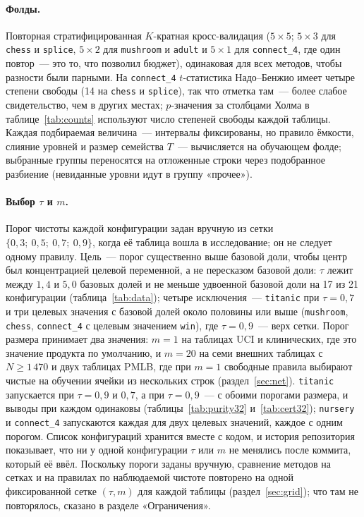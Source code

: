 \documentclass[11pt]{article}
\begin{document}
\paragraph{Фолды.} Повторная стратифицированная $K$-кратная кросс-валидация ($5\times5$; $5\times3$ для \texttt{chess} и \texttt{splice}, $5\times2$ для \texttt{mushroom} и \texttt{adult} и $5\times1$ для \texttt{connect\_4}, где один повтор~--- это то, что позволил бюджет), одинаковая для всех методов, чтобы разности были парными. На \texttt{connect\_4} $t$-статистика Надо--Бенжио имеет четыре степени свободы (14 на \texttt{chess} и \texttt{splice}), так что отметка там~--- более слабое свидетельство, чем в других местах; $p$-значения за столбцами Холма в таблице~\ref{tab:counts} используют число степеней свободы каждой таблицы. Каждая подбираемая величина~--- интервалы фиксированы, но правило ёмкости, слияние уровней и размер семейства $T$~--- вычисляется на обучающем фолде; выбранные группы переносятся на отложенные строки через подобранное разбиение (невиданные уровни идут в группу «прочее»).

\paragraph{Выбор $\tau$ и $m$.} Порог чистоты каждой конфигурации задан вручную из сетки $\{0{,}3;\ 0{,}5;\ 0{,}7;\ 0{,}9\}$, когда её таблица вошла в исследование; он не следует одному правилу. Цель~--- порог существенно выше базовой доли, чтобы центр был концентрацией целевой переменной, а не пересказом базовой доли: $\tau$ лежит между $1{,}4$ и $5{,}0$ базовых долей и не меньше удвоенной базовой доли на 17 из 21 конфигурации (таблица~\ref{tab:data}); четыре исключения~--- \texttt{titanic} при $\tau=0{,}7$ и три целевых значения с базовой долей около половины или выше (\texttt{mushroom}, \texttt{chess}, \texttt{connect\_4} с целевым значением \texttt{win}), где $\tau=0{,}9$~--- верх сетки. Порог размера принимает два значения: $m=1$ на таблицах UCI и клинических, где это значение продукта по умолчанию, и $m=20$ на семи внешних таблицах с $N\ge1\,470$ и двух таблицах PMLB, где при $m=1$ свободные правила выбирают чистые на обучении ячейки из нескольких строк (раздел~\ref{sec:net}). \texttt{titanic} запускается при $\tau=0{,}9$ и $0{,}7$, а при $\tau=0{,}9$~--- с обоими порогами размера, и выводы при каждом одинаковы (таблицы~\ref{tab:purity32} и~\ref{tab:cert32}); \texttt{nursery} и \texttt{connect\_4} запускаются каждая для двух целевых значений, каждое с одним порогом. Список конфигураций хранится вместе с кодом, и история репозитория показывает, что ни у одной конфигурации $\tau$ или $m$ не менялись после коммита, который её ввёл. Поскольку пороги заданы вручную, сравнение методов на сетках и на правилах по наблюдаемой чистоте повторено на одной фиксированной сетке $(\tau,m)$ для каждой таблицы (раздел~\ref{sec:grid}); что там не повторялось, сказано в разделе «Ограничения».
\end{document}
